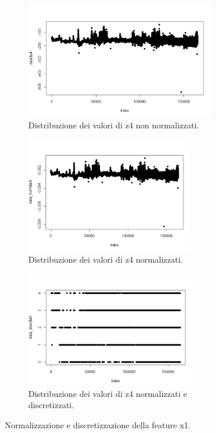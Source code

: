 \documentclass[12pt]{article}
\begin{document}
\begin{figure}[h]
	
	\begin{subfigure}{0.5\textwidth}
		\includegraphics[width=0.9\linewidth, height=5cm]{images/z4notnormalize.PNG} 
		\caption{Distribuzione dei valori di z4 non normalizzati.}
		\label{fig:x1nonNormalize}
	\end{subfigure}
	\begin{subfigure}{0.5\textwidth}
		\includegraphics[width=0.9\linewidth, height=5cm]{images/z4normalize.PNG}
		\caption{Distribuzione dei valori di z4 normalizzati.}
		\label{fig:subim2}
	\end{subfigure}
	\begin{subfigure}{0.5\textwidth}
		\includegraphics[width=0.9\linewidth, height=5cm]{images/z4discretize.PNG}
		\caption{Distribuzione dei valori di z4 normalizzati e discretizzati.}
		\label{fig:subim2}
	\end{subfigure}
	\caption{Normalizzazione e discretizzazione della feature x1.}
	\label{fig:z4}
\end{figure}
\end{document}
